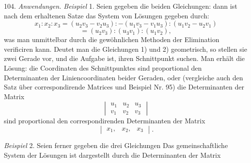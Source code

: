 104. \textit{Anwendungen. Beispiel} 1. Seien gegeben die beiden Gleichungen:
dann ist nach dem erhaltenen Satze das System von Lösungen gegeben durch:
\[ x_1:x_2:x_3 = (u_2v_3-v_2u_3):-(u_1v_3-v_1u_3):(u_1v_2-u_2v_1) \]
\[ = (u_2v_3):(u_3v_1):(u_1v_2), \]
was man unmittelbar durch die gewöhnlichen Methoden der Elimination verificiren kann. Deutet man die Gleichungen 1) und 2) geometrisch, so stellen sie zwei Gerade vor, und die Aufgabe ist, ihren Schnittpunkt suchen. Man erhält die Lösung: die Coordinaten des Schnittpunktes sind proportional den Determinanten der Liniencoordinaten beider Geraden, oder (vergleiche auch den Satz über correspondirende Matrices und Beispiel Nr. 95) die Determinanten der Matrix
\[
\begin{vmatrix} u_1 & u_2 & u_3 \\ v_1 & v_2 & v_3 \end{vmatrix}
\]
sind proportional den correspondirenden Determinanten der Matrix
\[ \begin{vmatrix} x_1, & x_2, & x_3 \end{vmatrix}. \]

\textit{Beispiel} 2. Seien ferner gegeben die drei Gleichungen
Das gemeinschaftliche System der Lösungen ist dargestellt durch die Determinanten der Matrix


